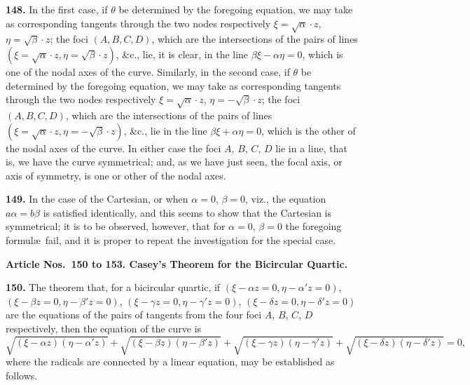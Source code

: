 \documentclass[12pt,a4paper]{article}
\theoremstyle{definition}
\begin{document}
\noindent\textbf{148.} In the first case, if $\theta$ be determined by the foregoing equation, we may
take as corresponding tangents through the two nodes respectively $\xi = \sqrt{\alpha}\cdot z$,
$\eta = \sqrt{\beta}\cdot z$; the foci $(A, B, C, D)$, which are the intersections of the pairs of
lines $(\xi = \sqrt{\alpha}\cdot z, \eta = \sqrt{\beta}\cdot z)$, \&c., lie, it is clear, in the line $\beta\xi - \alpha\eta = 0$, which is one of the nodal axes
of the curve. Similarly, in the second case, if $\theta$ be determined by the foregoing
equation, we may take as corresponding tangents through the two nodes respectively
$\xi = \sqrt{\alpha}\cdot z$, $\eta = -\sqrt{\beta}\cdot z$; the foci $(A, B, C, D)$, which are the intersections of the
pairs of lines $(\xi = \sqrt{\alpha}\cdot z, \eta = -\sqrt{\beta}\cdot z)$, \&c., lie in the line $\beta\xi + \alpha\eta = 0$, which is the other of the
nodal axes of the curve. In either case the foci $A$, $B$, $C$, $D$ lie in a line, that is,
we have the curve symmetrical; and, as we have just seen, the focal axis, or axis of
symmetry, is one or other of the nodal axes.

\newpage
\noindent\textbf{149.} In the case of the Cartesian, or when $\alpha = 0$, $\beta = 0$, viz., the equation $a\alpha = b\beta$
is satisfied identically, and this seems to show that the Cartesian is symmetrical; it
is to be observed, however, that for $\alpha = 0$, $\beta = 0$ the foregoing formul\ae\ fail, and it is
proper to repeat the investigation for the special case.

\vspace{0.5em}
\noindent\textbf{Article Nos.~150 to 153. Casey's Theorem for the Bicircular Quartic.}

\vspace{0.3em}
\noindent\textbf{150.} The theorem that, for a bicircular quartic, if $(\xi - \alpha z = 0, \eta - \alpha'z = 0)$,
$(\xi - \beta z = 0, \eta - \beta'z = 0)$, $(\xi - \gamma z = 0, \eta - \gamma'z = 0)$, $(\xi - \delta z = 0, \eta - \delta'z = 0)$
are the equations of the pairs of tangents from the four foci $A$, $B$, $C$, $D$ respectively,
then the equation of the curve is
\[
\sqrt{(\xi - \alpha z)(\eta - \alpha'z)} + \sqrt{(\xi - \beta z)(\eta - \beta'z)} + \sqrt{(\xi - \gamma z)(\eta - \gamma'z)} + \sqrt{(\xi - \delta z)(\eta - \delta'z)} = 0,
\]
where the radicals are connected by a linear equation, may be established as follows.
\end{document}
